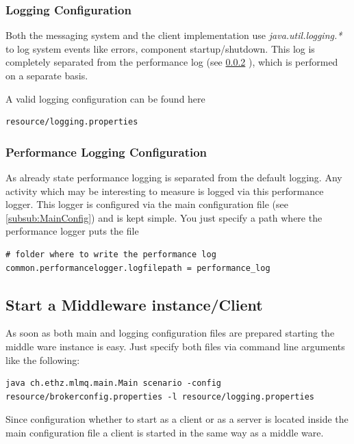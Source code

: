 \documentclass[a4paper]{article}
\begin{document}
\subsubsection{Logging Configuration}

Both the messaging system and the client implementation use \textit{java.util.logging.*} to log system events like errors, component startup/shutdown. This log is completely separated from the performance log (see \ref{subsub:PerfLogConfig} ), which is performed on a separate basis.

A valid logging configuration can be found here

\begin{verbatim} 
resource/logging.properties
\end{verbatim}

\subsubsection{Performance Logging Configuration}
\label{subsub:PerfLogConfig}

As already state performance logging is separated from the default logging. Any activity which may be interesting to measure is logged via this performance logger. This logger is configured via the main configuration file (see \ref{subsub:MainConfig}) and is kept simple. You just specify a path where the performance logger puts the file

\begin{verbatim} 
# folder where to write the performance log
common.performancelogger.logfilepath = performance_log
\end{verbatim}

\subsection{Start a Middleware instance/Client}
As soon as both main and logging configuration files are prepared starting the middle ware instance is easy. Just specify both files via command line arguments like the following:

\begin{verbatim} 
java ch.ethz.mlmq.main.Main scenario -config resource/brokerconfig.properties -l resource/logging.properties
\end{verbatim}

Since configuration whether to start as a client or as a server is located inside the main configuration file a client is started in the same way as a middle ware.
\end{document}
